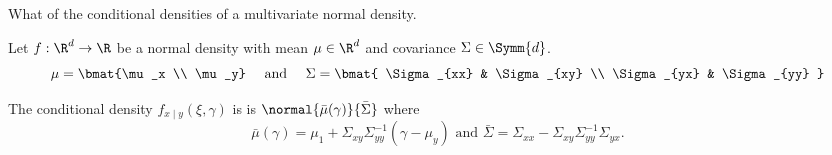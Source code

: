 

What of the conditional densities of a multivariate normal density.


\begin{prop}

Let $f: \R^d \to \R$ be a normal density with mean $\mu \in \R^d$ and covariance $\Sigma \in \Symm{d}$.
\[
  \mu = \bmat{\mu_x \\ \mu_y} \quad \text{ and } \quad
  \Sigma = \bmat{
    \Sigma_{xx} & \Sigma_{xy} \\
    \Sigma_{yx} & \Sigma_{yy}
  }
\]

The conditional density $f_{x \mid y}(\xi, \gamma)$ is is $\normal{\bar{\mu}(\gamma)}{\bar{\Sigma}}$ where
  \[
    \bar{\mu}(\gamma) = \mu_1 + \Sigma_{xy}\Sigma_{yy}^{-1}(\gamma - \mu_y) \text{ and } \bar{\Sigma} = \Sigma_{xx} - \Sigma_{xy}\Sigma_{yy}^{-1}\Sigma_{yx}.
  \]
\end{prop}
